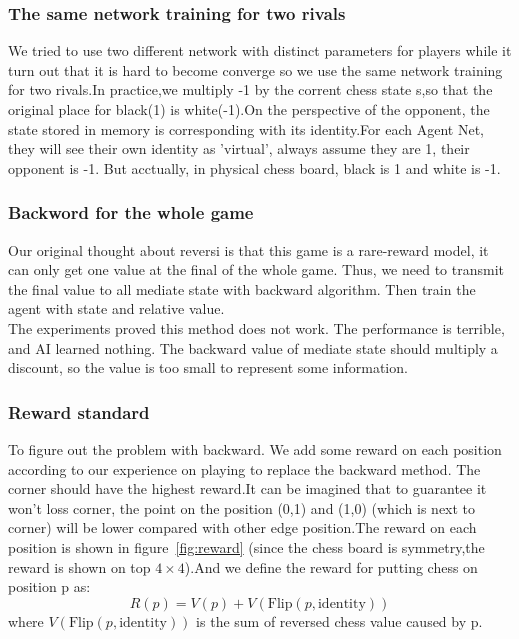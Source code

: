 \documentclass[10pt,twocolumn,letterpaper]{article}
\begin{document}
\subsubsection{The same network training for two rivals}
\quad We tried to use two different network with distinct parameters for players while it turn out that it is hard to become converge so we use the same network training for two rivals.In practice,we multiply -1 by the corrent chess state s,so that the original place for black(1) is white(-1).On the perspective of the opponent, the state stored in memory is corresponding with its identity.For each Agent Net, they will see their own identity as 'virtual', always assume they are 1, their opponent is -1. But acctually, in physical chess board, black is 1 and white is -1.
\subsubsection{Backword for the whole game}
\quad Our original thought about reversi is that this game is a rare-reward model, it can only get one value at the final of the whole game. Thus, we need to transmit the final value to all mediate state with backward algorithm. Then train the agent with state and relative value.\\
The experiments proved this method does not work. The performance is terrible, and AI learned nothing. The backward value of mediate state should multiply a discount, so the value is too small to represent some information. 



\subsubsection{Reward standard}
\quad To figure out the problem with backward. We add some reward on each position according to our experience on playing to replace the backward method. The corner should have the highest reward.It can be imagined that to guarantee it won't loss corner, the point on the position (0,1) and (1,0) (which is next to corner) will be lower compared with other edge position.The reward on each position is shown in figure~\ref{fig:reward} (since the chess board is symmetry,the reward is shown on top $4 \times 4$).And we define the reward for putting chess on position p as:
$$R(p)= V(p) + V(\text{Flip}(p,\text{identity}))$$
where  $V(\text{Flip}(p,\text{identity}))$ is the sum of reversed chess value caused by p.
\end{document}
